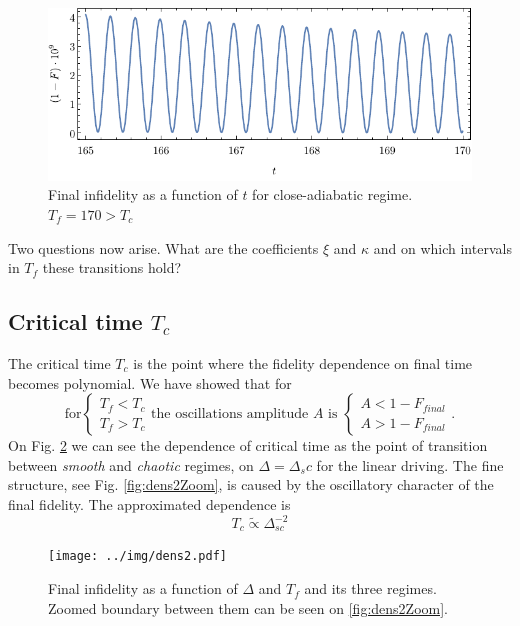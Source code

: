\begin{figure}[H]
    \centering
    \includegraphics[scale=1.2]{../img/overcritical.pdf}
    \caption{Final infidelity as a function of $t$ for close-adiabatic regime. $T_f=170>T_c$}
    \label{fig:overcritical}
\end{figure}

Two questions now arise. What are the coefficients $\xi$ and $\kappa$ and on which intervals in $T_f$ these transitions hold? 

\subsection{Critical time $T_c$}
The critical time $T_c$ is the point where the fidelity dependence on final time becomes polynomial. We have showed that for 
\begin{equation}
    \text{for}\begin{cases}
        T_f<T_c \\
        T_f>T_c 
    \end{cases}\text{the oscillations amplitude } A \text{ is }
    \begin{cases}
        A<1-F_{final}\\
        A>1-F_{final}
    \end{cases}.
\end{equation}
On Fig. \ref{fig:dens2} we can see the dependence of critical time as the point of transition between \emph{smooth} and \emph{chaotic} regimes, on $\Delta=\Delta_sc$ for the linear driving. The fine structure, see Fig. \ref{fig:dens2Zoom}, is caused by the oscillatory character of the final fidelity. The approximated dependence is
\begin{equation}
    T_c\tilde\propto \Delta_{sc}^{-2}
\end{equation}


\begin{figure}[H]
    \centering 
    \texttt{[image: ../img/dens2.pdf]}
    \caption{Final infidelity as a function of $\Delta$ and $T_f$ and its three regimes. Zoomed boundary between them can be seen on \ref{fig:dens2Zoom}.}
    \label{fig:dens2}
\end{figure}

